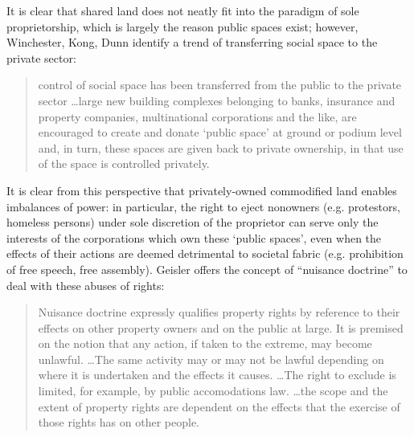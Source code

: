 \documentclass[12pt, letterpaper, oneside]{article}
\begin{document}
It is clear that shared land does not neatly fit into the paradigm of sole proprietorship, which is largely the reason public spaces exist; however, Winchester, Kong, Dunn identify a trend of transferring social space to the private sector:
\begin{quote}
control of social space has been transferred from the public to the private sector \ldots large new building complexes belonging to banks, insurance and property companies, multinational corporations and the like, are encouraged to create and donate `public space' at ground or podium level and, in turn, these spaces are given back to private ownership, in that use of the space is controlled privately.
\end{quote}
It is clear from this perspective that privately-owned commodified land enables imbalances of power: in particular, the right to eject nonowners (e.g. protestors, homeless persons) under sole discretion of the proprietor can serve only the interests of the corporations which own these `public spaces', even when the effects of their actions are deemed detrimental to societal fabric (e.g. prohibition of free speech, free assembly). Geisler offers the concept of ``nuisance doctrine'' to deal with these abuses of rights:
\begin{quote}
Nuisance doctrine expressly qualifies property rights by reference to their effects on other property owners and on the public at large. It is premised on the notion that any action, if taken to the extreme, may become unlawful. \ldots The same activity may or may not be lawful depending on where it is undertaken and the effects it causes. \ldots The right to exclude is limited, for example, by public accomodations law. \ldots the scope and the extent of property rights are dependent on the effects that the exercise of those rights has on other people.
\end{quote}
\end{document}
